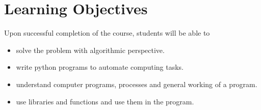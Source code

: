 \section{Learning Objectives}
Upon successful completion of the course, students will be able to
\begin{itemize}
\item solve the problem with algorithmic perspective.
\item write python programs to automate computing tasks.
\item understand computer programs, processes and general working of a program.
\item use libraries and functions and use them in the program.
\end{itemize}
